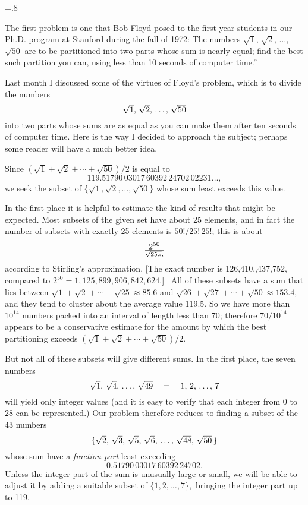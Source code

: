 \magnification{}
\hsize=.8\hsize

The first problem is one that Bob Floyd posed to the first-year students in
our Ph.D. program at Stanford during the fall of 1972:
\smallskip
{\narrower\noindent{}%
The numbers $\sqrt1$, $\sqrt2$, $\ldots$, $\sqrt{50}$ are to be partitioned
into two parts whose sum is nearly equal; find the best such partition you
can, using less than 10 seconds of computer time.''\bigskip}


\bigskip
\noindent Last month I discussed some of the virtues of Floyd's problem, which
is to divide the numbers
$$\hbox{$\sqrt1$,\ $\sqrt2$,\ $\ldots,$\ $\sqrt{50}$}$$
into two parts whose
sums are as equal as you can make them after ten seconds of computer time. Here
is the way I decided to approach the subject; perhaps some reader will have a
much better idea.

Since $(\sqrt1+\sqrt2+\cdots+\sqrt{50})/2$ is equal to
$$119.51790\,03017\,60392\,24702\,02231\ldots,$$ we seek the subset of
$\{\sqrt1,\sqrt2,\ldots,\sqrt{50}\}$ whose sum least exceeds this value.

In the first place it is helpful to estimate the kind of results that might be
expected. Most subsets of the given set have about 25 elements, and in fact the
number of subsets with exactly 25 elements is $50!/25!\,25!$; this is about
$$2^{50}\over\sqrt{25\pi},$$ according to Stirling's approximation. [The exact
number is 126,410,,437,752, compared to
$2^{50}=1{,}125{,}899{,}906{,}842{,}624.$]~ All of these subsets have
a sum that lies between $\sqrt1+\sqrt2+\cdots+\sqrt{25}\approx85.6$ and
$\sqrt{26}+\sqrt{27}+\cdots+\sqrt{50}\approx153.4,$ and they tend to cluster
about the average value 119.5. So we have more than $10^{14}$ numbers packed
into an interval of length less than 70; therefore $70/10^{14}$ appears to be
a conservative estimate for the amount by which the best partitioning exceeds
$(\sqrt1+\sqrt2+\cdots+\sqrt{50})/2.$

But not all of these subsets will give different sums. In the first place, the
seven numbers $$\hbox{$\sqrt1$, $\sqrt4$, $\ldots,$ $\sqrt{49}$}\quad=\quad
\hbox{1, 2, $\ldots,$ 7}$$ will
yield only integer values (and it is easy to verify that each integer from 0 to
28 can be represented.) Our problem therefore reduces to finding a subset of
the 43 numbers $$\hbox{$\{\sqrt2$, $\sqrt3$, $\sqrt5$, $\sqrt6$, $\ldots,$
$\sqrt{48}$, $\sqrt{50}\,\}$}$$
whose sum have a {\it fraction part\/} least exceeding
$$0.51790\,03017\,60392\,24702.$$
Unless the integer part of the sum is unusually large or small, we will be able
to adjust it by adding a suitable subset of $\{1,2,\ldots,7\},$ bringing the
integer part up to 119.

